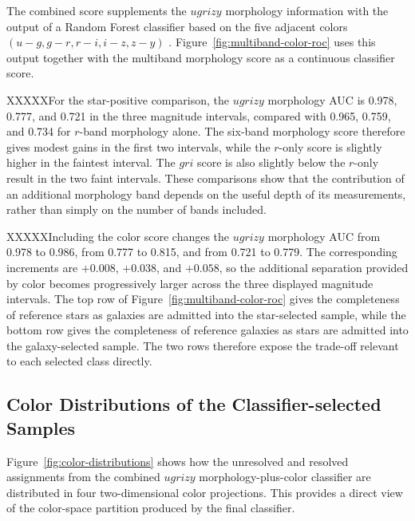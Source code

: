 The combined score supplements the $ugrizy$ morphology information with the
output of a Random Forest classifier based on the five adjacent colors
$(u-g,g-r,r-i,i-z,z-y)$ \citep{Breiman2001RandomForests}.  Figure~\ref{fig:multiband-color-roc}
uses this output together with the multiband morphology score as a continuous
classifier score.


XXXXXFor the star-positive comparison, the $ugrizy$ morphology AUC is 0.978,
0.777, and 0.721 in the three magnitude intervals, compared with 0.965,
0.759, and 0.734 for $r$-band morphology alone.  The six-band morphology score
therefore gives modest gains in the first two intervals, while the $r$-only
score is slightly higher in the faintest interval.  The $gri$ score is also
slightly below the $r$-only result in the two faint intervals.  These
comparisons show that the contribution of an additional morphology band
depends on the useful depth of its measurements, rather than simply on the
number of bands included.

XXXXXIncluding the color score changes the $ugrizy$ morphology AUC from 0.978 to
0.986, from 0.777 to 0.815, and from 0.721 to 0.779.  The corresponding
increments are $+0.008$, $+0.038$, and $+0.058$, so the additional separation
provided by color becomes progressively larger across the three displayed
magnitude intervals.  The top row of
Figure~\ref{fig:multiband-color-roc} gives the completeness of reference stars
as galaxies are admitted into the star-selected sample, while the bottom row
gives the completeness of reference galaxies as stars are admitted into the
galaxy-selected sample.  The two rows therefore expose the trade-off relevant
to each selected class directly.

\subsection{Color Distributions of the Classifier-selected Samples}
\label{sec:classifier-selected-colors}

Figure~\ref{fig:color-distributions} shows how the unresolved and resolved
assignments from the combined $ugrizy$ morphology-plus-color classifier are
distributed in four two-dimensional color projections.  This provides a
direct view of the color-space partition produced by the final classifier.

